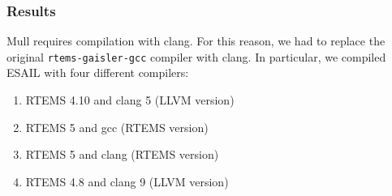 \subsubsection{Results}

Mull requires compilation with clang. For this reason, we had to replace the original \texttt{rtems-gaisler-gcc} compiler with clang. In particular, we compiled ESAIL with four different compilers:

\begin{enumerate}
	\item RTEMS 4.10 and clang 5 (LLVM version)
	\item RTEMS 5 and gcc (RTEMS version)
	\item RTEMS 5 and clang (RTEMS version)
	\item RTEMS 4.8 and clang 9 (LLVM version)
\end{enumerate}

